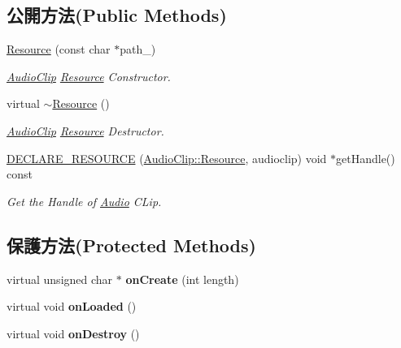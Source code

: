 \subsection*{公開方法(Public Methods)}
\begin{DoxyCompactItemize}
\item 
\hyperlink{class_magnum_1_1_audio_clip_1_1_resource_a4d0c425afd82c534fce82b2f4ec33073}{Resource} (const char $\ast$path\+\_\+)
\begin{DoxyCompactList}\small\item\em \hyperlink{class_magnum_1_1_audio_clip}{Audio\+Clip} \hyperlink{class_magnum_1_1_audio_clip_1_1_resource}{Resource} Constructor. \end{DoxyCompactList}\item 
virtual \hyperlink{class_magnum_1_1_audio_clip_1_1_resource_a31c5abfb8dc85cb158798e99d1400c7a}{$\sim$\+Resource} ()
\begin{DoxyCompactList}\small\item\em \hyperlink{class_magnum_1_1_audio_clip}{Audio\+Clip} \hyperlink{class_magnum_1_1_audio_clip_1_1_resource}{Resource} Destructor. \end{DoxyCompactList}\item 
\hyperlink{class_magnum_1_1_audio_clip_1_1_resource_ab04d84146f1c4c1581dc442fa4028871}{D\+E\+C\+L\+A\+R\+E\+\_\+\+R\+E\+S\+O\+U\+R\+CE} (\hyperlink{class_magnum_1_1_audio_clip_1_1_resource}{Audio\+Clip\+::\+Resource}, audioclip) void $\ast$get\+Handle() const 
\begin{DoxyCompactList}\small\item\em Get the Handle of \hyperlink{class_magnum_1_1_audio}{Audio} C\+Lip. \end{DoxyCompactList}\end{DoxyCompactItemize}
\subsection*{保護方法(Protected Methods)}
\begin{DoxyCompactItemize}
\item 
virtual unsigned char $\ast$ {\bfseries on\+Create} (int length)\hypertarget{class_magnum_1_1_audio_clip_1_1_resource_a4ce43457d0a48056a7d055662422acea}{}\label{class_magnum_1_1_audio_clip_1_1_resource_a4ce43457d0a48056a7d055662422acea}

\item 
virtual void {\bfseries on\+Loaded} ()\hypertarget{class_magnum_1_1_audio_clip_1_1_resource_ac7f5b3b619d7255683ba37b989e3c28e}{}\label{class_magnum_1_1_audio_clip_1_1_resource_ac7f5b3b619d7255683ba37b989e3c28e}

\item 
virtual void {\bfseries on\+Destroy} ()\hypertarget{class_magnum_1_1_audio_clip_1_1_resource_a12404cbfb3c729a73aff132583e7fdab}{}\label{class_magnum_1_1_audio_clip_1_1_resource_a12404cbfb3c729a73aff132583e7fdab}

\end{DoxyCompactItemize}
